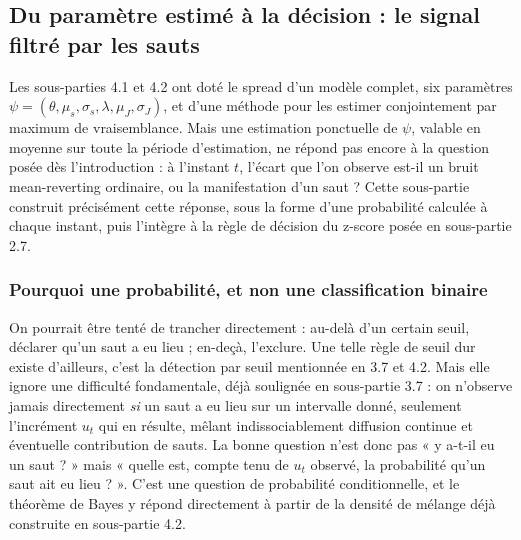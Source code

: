 \documentclass{article}
\begin{document}
\subsection{Du paramètre estimé à la décision : le signal filtré par les sauts}
Les sous-parties 4.1 et 4.2 ont doté le spread d'un modèle complet, six paramètres $\psi=(\theta,\mu_s,\sigma_s,\lambda,\mu_J,\sigma_J)$, et d'une méthode pour les estimer conjointement par maximum de vraisemblance. Mais une estimation ponctuelle de $\psi$, valable en moyenne sur toute la période d'estimation, ne répond pas encore à la question posée dès l'introduction : à l'instant $t$, l'écart que l'on observe est-il un bruit mean-reverting ordinaire, ou la manifestation d'un saut ? Cette sous-partie construit précisément cette réponse, sous la forme d'une probabilité calculée à chaque instant, puis l'intègre à la règle de décision du z-score posée en sous-partie 2.7.
\subsubsection*{Pourquoi une probabilité, et non une classification binaire}
On pourrait être tenté de trancher directement : au-delà d'un certain seuil, déclarer qu'un saut a eu lieu ; en-deçà, l'exclure. Une telle règle de seuil dur existe d'ailleurs, c'est la détection par seuil mentionnée en 3.7 et 4.2. Mais elle ignore une difficulté fondamentale, déjà soulignée en sous-partie 3.7 : on n'observe jamais directement \emph{si} un saut a eu lieu sur un intervalle donné, seulement l'incrément $u_t$ qui en résulte, mêlant indissociablement diffusion continue et éventuelle contribution de sauts. La bonne question n'est donc pas « y a-t-il eu un saut ? » mais « quelle est, compte tenu de $u_t$ observé, la probabilité qu'un saut ait eu lieu ? ». C'est une question de probabilité conditionnelle, et le théorème de Bayes y répond directement à partir de la densité de mélange déjà construite en sous-partie 4.2.
\end{document}
